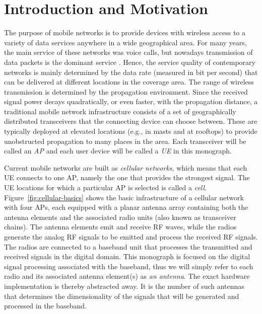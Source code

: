 
\chapter{Introduction and Motivation}
\label{c-introduction} 

The purpose of mobile networks is to provide devices with wireless access to a variety of data services anywhere in a wide geographical area. For many years, the main service of these networks was voice calls, but nowadays transmission of data packets is the dominant service \cite{EricssonMobility}. Hence, the service quality of contemporary networks is mainly determined by the data rate (measured in bit per second) that can be delivered at different locations in the coverage area. The range of  wireless transmission is determined by the propagation environment. Since the received signal power decays quadratically, or even faster, with the propagation distance, a traditional mobile network infrastructure consists of a set of geographically distributed transceivers that the connecting device can choose between. These are typically deployed at elevated locations (e.g., in masts and at rooftops) to provide unobstructed propagation to many places in the area. Each transceiver will be called an \emph{\gls{AP}} and each user device will be called a \emph{\gls{UE}} in this monograph.

Current mobile networks are built as \emph{cellular networks}, which means that each \gls{UE} connects to one \gls{AP}, namely the one that provides the strongest signal. The \gls{UE} locations for which a particular \gls{AP} is selected is called a \emph{cell}. Figure~\ref{fig:cellular-basics} shows the basic infrastructure of a cellular network with four \glspl{AP}, each equipped with a planar antenna array containing both the antenna elements and the associated radio units (also known as transceiver chains). The antenna elements emit and receive \gls{RF} waves, while the radios generate the analog RF signals to be emitted and process the received RF signals. The radios are connected to a baseband unit that processes the transmitted and received signals in the digital domain. This monograph is focused on the digital signal processing associated with the baseband, thus we will simply refer to each radio and its associated antenna element(s) as \emph{an antenna}. The exact hardware implementation is thereby abstracted away. It is the number of such antennas that determines the dimensionality of the signals that will be generated and processed in the baseband.

